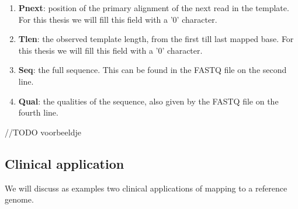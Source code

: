 \begin{enumerate}
	\item \textbf{Pnext}: position of the primary alignment of the next read in the template. For this thesis we will fill this field with a '0' character.
	
	\item \textbf{Tlen}: the observed template length, from the first till last mapped base. For this thesis we will fill this field with a '0' character.
	
	\item \textbf{Seq}: the full sequence. This can be found in the FASTQ file on the second line.
	
	\item \textbf{Qual}: the qualities of the sequence, also given by the FASTQ file on the fourth line.
	
\end{enumerate}


//TODO voorbeeldje

\subsection{Clinical application}

We will discuss as examples two clinical applications of mapping to a reference genome.

